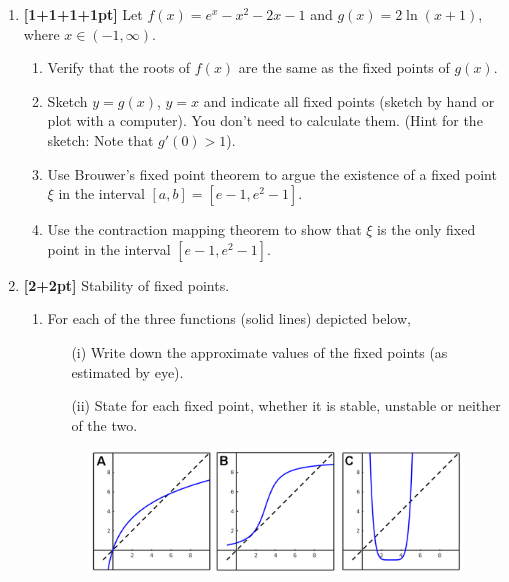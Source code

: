 \documentclass[11pt]{article}
\begin{document}
\begin{enumerate}
\item {\bf [1+1+1+1pt]}  Let $f(x) = e^x - x^2 -2x - 1 $ and $g(x) = 2 \ln
  (x+1)$, where $x\in(-1,\infty)$.
\begin{enumerate}
\item Verify that the roots of $f(x)$ are the same as the fixed points
  of $g(x)$.
\item Sketch $y = g(x)$, $y =x$ and indicate all fixed points (sketch
  by hand or plot with a computer). You don't need to calculate
  them. (Hint for the sketch: Note that $g'(0)>1$).
\item Use Brouwer's fixed point theorem to argue the existence of a
  fixed point $\xi$ in the interval $[a,b] = [e-1 , e^2 - 1]$.
\item Use the contraction mapping theorem to show that $\xi$ is the
  only fixed point in the interval $[e-1,e^2 -1]$.
\end{enumerate}


\item {\bf [2+2pt]} Stability of fixed points.
\begin{enumerate}
\item For each of the three functions (solid lines) depicted below,
	\begin{enumerate}\setlength{\itemsep}{0.2cm}
		\item[(i)]  Write down the approximate values of the
                  fixed points (as estimated by eye).
		\item[(ii)] State for each fixed point, whether it is
                  stable, unstable or neither of the two.
	\end{enumerate}
	\begin{figure}[h!]
	\centering
	\includegraphics[width=\textwidth]{fig}
	\end{figure}


\end{enumerate}
\end{enumerate}
\end{document}
